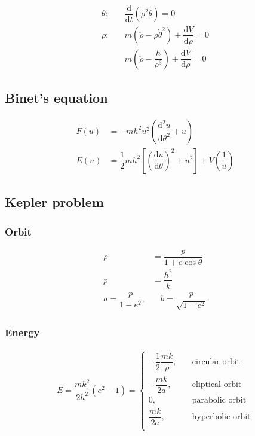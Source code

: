\documentclass[10pt, a4paper]{article}
\def\d{\mathrm{d}}
\begin{document}
\begin{multicols}{2}
	\begin{align}
		\theta:& \quad \dfrac{\d}{\d t} \left(\rho^2 \dot{\theta}\right) = 0\\
		\rho:& \quad m(\ddot{\rho} - \rho \dot{\theta}^2) + \dfrac{\d V}{\d \rho} = 0\\
		& \quad m(\ddot{\rho} - \dfrac{h}{\rho^3}) + \dfrac{\d V}{\d \rho} = 0
	\end{align}

\subsection{Binet's equation}

	\begin{align}
		F(u) &= -mh^2u^2\left(\dfrac{\d^2 u}{\d \theta^2} + u\right)\\
		E(u) &= \dfrac{1}{2}mh^2\left[\left(\dfrac{\d u}{\d \theta}\right)^2 + u^2\right] + V\left(\dfrac{1}{u}\right)
	\end{align}

\subsection{Kepler problem}

\subsubsection{Orbit}

	\begin{align}
		\rho &= \dfrac{p}{1 + e\cos\theta}\\
		p &= \dfrac{h^2}{k}\\
		a = \dfrac{p}{1 - e^2},&\quad
		b = \dfrac{p}{\sqrt{1 - e^2}} 
	\end{align}

\subsubsection{Energy}
	
	\begin{align}
		E = \dfrac{mk^2}{2h^2}(e^2 - 1) =
		\left\{
			\begin{aligned}
				 -\dfrac{1}{2} \dfrac{mk}{\rho},& \quad \text{circular orbit}\\
				 -\dfrac{mk}{2a},& \quad \text{eliptical orbit}\\
				 0,& \quad \text{parabolic orbit}\\
				 \dfrac{mk}{2a},& \quad \text{hyperbolic orbit}\\
			\end{aligned}
		\right.
	\end{align}


\end{multicols}
\end{document}
